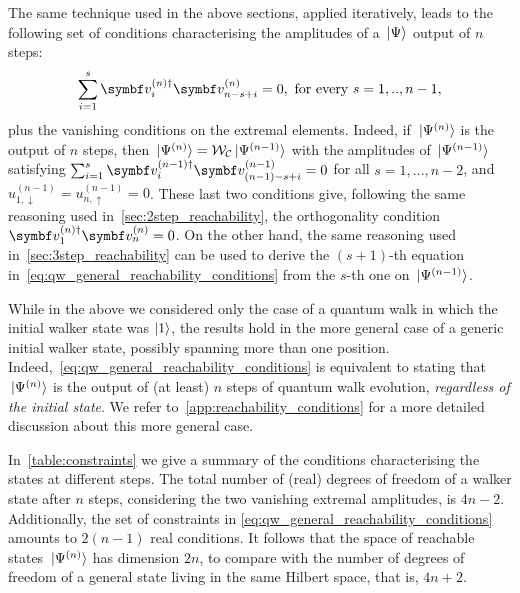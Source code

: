 The same technique used in the above sections, applied iteratively, leads to the following set of conditions characterising the amplitudes of a $\ket*{\Psi}$ output of $n$ steps:
\begin{equation}
	\sum_{i=1}^s \bs v_i^{(n)\dagger} \bs v^{(n)}_{n-s+i} = 0,
	\text{ for every } s=1,..,n-1,
	\label{eq:qw_general_reachability_conditions}
\end{equation}
plus the vanishing conditions on the extremal elements.
Indeed, if $\ket*{\Psi^{(n)}}$ is the output of $n$ steps, then $\ket*{\Psi^{(n)}} = \mathcal W_{\mathcal C}\ket*{\Psi^{(n-1)}}$ with the amplitudes of $\ket*{\Psi^{(n-1)}}$ satisfying
$\sum_{i=1}^s \bs v_i^{(n-1)\dagger} \bs v_{(n-1)-s+i}^{(n-1)} = 0$
for all $s=1,...,n-2$,
and $u_{1,\downarrow}^{(n-1)} = u_{n, \uparrow}^{(n-1)} = 0$.
These last two conditions give, following the same reasoning used in~\cref{sec:2step_reachability}, the orthogonality condition $\bs v_1^{(n)\dagger} \bs v_n^{(n)} = 0$.
On the other hand, the same reasoning used in~\cref{sec:3step_reachability} can be used to derive the $(s+1)$-th equation in~\cref{eq:qw_general_reachability_conditions} from the $s$-th one on $\ket*{\Psi^{(n-1)}}$.

While in the above we considered only the case of a quantum walk in which the initial walker state was $\ket1$, 
the results hold in the more general case of a generic initial walker state, possibly spanning more than one position.
Indeed,~\cref{eq:qw_general_reachability_conditions} is equivalent to stating that $\ket*{\Psi^{(n)}}$ is the output of (at least) $n$ steps of quantum walk evolution, \textit{regardless of the initial state}.
We refer to~\cref{app:reachability_conditions} for a more detailed discussion about this more general case.

In~\cref{table:constraints} we give a summary of the conditions characterising the states at different steps.
The total number of (real) degrees of freedom of a walker state after $n$ steps, considering the two vanishing extremal amplitudes, is $4n - 2$.
Additionally, the set of constraints in \cref{eq:qw_general_reachability_conditions} amounts to $2(n-1)$ real conditions.
It follows that the space of reachable states $\ket*{\Psi^{(n)}}$ has dimension $2n$, to compare with the number of degrees of freedom of a general state living in the same Hilbert space, that is, $4n + 2$.

